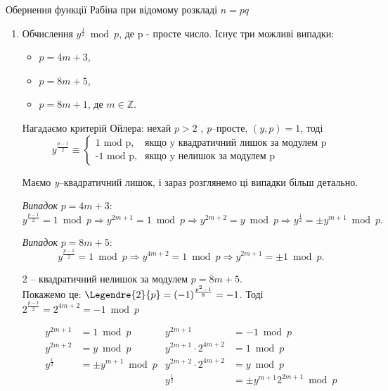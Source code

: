 \begin{algorithm}{Обернення функції Рабіна при відомому розкладі $n = pq$}
\begin{enumerate}
\item Обчислення $y ^{\frac{1}{2}} \bmod p$, де p - просте число.
Існує три можливі випадки:
\begin{itemize}
        \item $p=4m+3$,
        \item $p=8m+5$,
        \item $p=8m+1$, де $m \in \mathbb{Z}$.
\end{itemize}

Нагадаємо критерій Ойлера:
нехай $p>2$ , \textsl{p}--просте, $(y,p)=1$, тоді
\begin{equation}
y^{\frac{p-1}{2}} \equiv \begin{cases}
          \text{1 mod p}, &\text{якщо y квадратичний лишок за модулем p} \\
         \text{-1 mod p}, &\text{якщо y нелишок за модулем p}
        \end{cases}
\end{equation}

Маємо \textsl{y}--квадратичний лишок, і зараз розглянемо ці випадки більш детально. \par

\textit{Випадок} $p=4m+3$:  \\
\[
y^{\frac{p-1}{2}}=1 \bmod p \Rightarrow y^{2m+1}=1 \bmod p \Rightarrow y^{2m+2}=y \bmod p \Rightarrow  y ^{\frac{1}{2}} = \pm y^{m+1} \bmod p.
\]

\textit{Випадок} $p=8m+5$: \\
\[
y^{\frac{p-1}{2}}=1 \bmod p \Rightarrow y^{4m+2}=1 \bmod p \Rightarrow y^{2m+1}= \pm 1 \bmod p .
\]
\begin{remark}
2 -- квадратичний нелишок за модулем $p=8m+5$. \\
Покажемо це:  $\Legendre{2}{p} = (-1)^{\frac{p^2-1}{8}}=-1$. Тоді $2^{\frac{p-1}{2}}=2^{4m+2}=-1\bmod p$
\end{remark}
\begin{align*}
y^{2m+1}&=1 \bmod p & y^{2m+1} &=-1 \bmod p \\
y^{2m+2}&=y \bmod p & y^{2m+1}\cdot 2^{4m+2} &=1 \bmod p \\
y^{\frac{1}{2}} &= \pm y^{m+1} \bmod p & y^{2m+2}\cdot 2^{4m+2} &= y \bmod p \\
 && y^{\frac{1}{2}}&=\pm y^{m+1} 2^{2m+1} \bmod p 
\end{align*}


\end{enumerate}
\end{algorithm}
